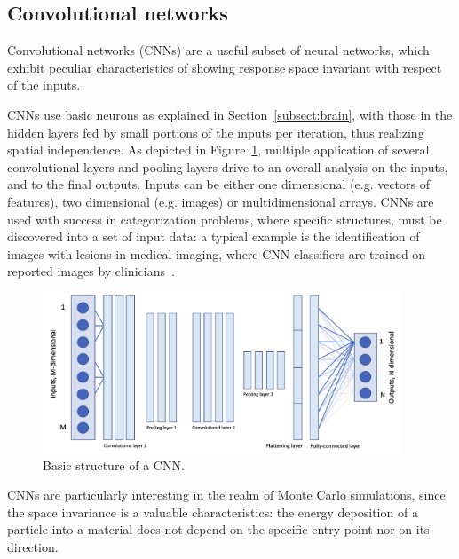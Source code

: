 \subsection{Convolutional networks}
Convolutional networks (CNNs) are a useful subset of neural networks, which exhibit peculiar characteristics of showing  response space invariant with respect of the inputs.

CNNs use basic neurons as explained in Section~\ref{subsect:brain}, with those in the hidden layers fed by small portions of the inputs per iteration, thus realizing spatial independence. As depicted in Figure~\ref{fig:cnn}, multiple application of several convolutional layers and pooling layers drive to an overall analysis on the inputs, and to the final  outputs. Inputs can be either one dimensional (e.g. vectors of features), two dimensional (e.g. images) or multidimensional arrays.
CNNs are used with success in categorization problems, where specific structures, must be discovered into a set of input data: a typical example is the identification of images with lesions in medical imaging, where CNN classifiers are trained on reported images by clinicians~\cite{Anwar2018}.

 \begin{figure}[h]
    \centering
         \includegraphics[width=0.95\textwidth]{images/cnn.png}
     \caption{Basic structure of a CNN.}
     \label{fig:cnn}
\end{figure}


CNNs are particularly interesting in the realm of Monte Carlo simulations, since the space invariance is a valuable characteristics:  
the energy deposition of a particle into a material
does not depend on the specific entry point nor on its direction.

